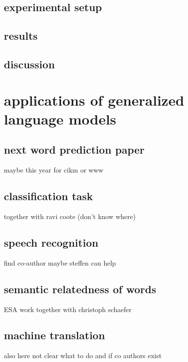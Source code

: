 \documentclass[•]{book}
\begin{document}
\section{experimental setup}
\section{results}
\section{discussion}

\chapter{applications of generalized language models}
\section{next word prediction paper}
maybe this year for cikm or www

\section{classification task}
together with ravi coote (don't know where)

\section{speech recognition}
find co-author maybe steffen can help

\section{semantic relatedness of words}
ESA work together with christoph schaefer

\section{machine translation}
also here not clear what to do and if co authors exist

\end{document}
